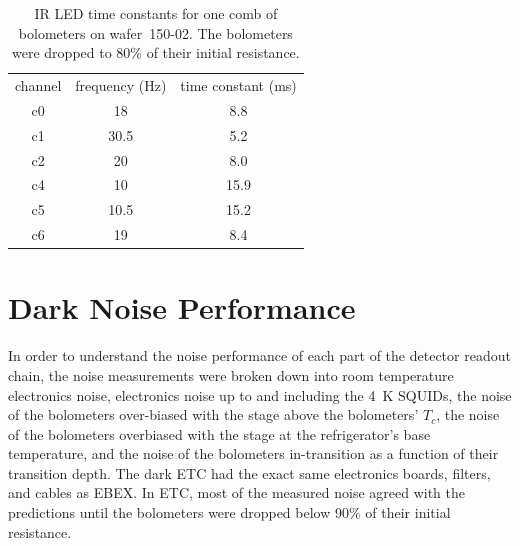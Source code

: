 \begin{table}[htp]
\begin{center}
\begin{tabular}{|c|c|c|}
channel & frequency (Hz) & time constant (ms) \\
c0 & 18 & 8.8 \\
c1 & 30.5 & 5.2 \\
c2 & 20 & 8.0 \\
c4 & 10 & 15.9 \\
c5 & 10.5 & 15.2 \\
c6 & 19 & 8.4 \\
\end{tabular}
\end{center}
\caption{IR LED time constants for one comb of bolometers on wafer~150-02. The bolometers were dropped to 80\% of their initial resistance. 
\label{tab:optical_tau} }
\end{table}









\section{Dark Noise Performance}
\label{sec:dark_noise}

In order to understand the noise performance of each part of the detector readout chain, the noise measurements were broken down into 
room temperature electronics noise, 
electronics noise up to and including the 4~K \ac{SQUID}s, 
the noise of the bolometers over-biased with the stage above the bolometers' $T_{c}$, 
the noise of the bolometers overbiased with the stage at the refrigerator's base temperature, 
and the noise of the bolometers in-transition as a function of their transition depth. 
The dark \ac{ETC} had the exact same electronics boards, filters, and cables as \ac{EBEX}. 
In \ac{ETC}, most of the measured noise agreed with the predictions until the bolometers were dropped below 90\% of their initial resistance. 


